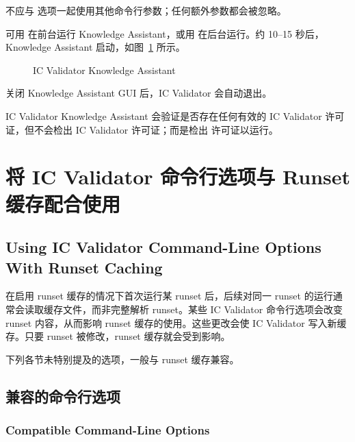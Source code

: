 不应与  选项一起使用其他命令行参数；任何额外参数都会被忽略。

可用  在前台运行 Knowledge Assistant，或用  在后台运行。约 10--15 秒后，Knowledge Assistant 启动，如图~\ref{fig:icv-knowledge-assistant} 所示。

\begin{figure}[htbp]
\centering
{}
\caption{IC Validator Knowledge Assistant}
\label{fig:icv-knowledge-assistant}
\end{figure}

关闭 Knowledge Assistant GUI 后，IC Validator 会自动退出。

IC Validator Knowledge Assistant 会验证是否存在任何有效的 IC Validator 许可证，但不会检出 IC Validator 许可证；而是检出  许可证以运行。

\section{将 IC Validator 命令行选项与 Runset 缓存配合使用}
\subsection*{Using IC Validator Command-Line Options With Runset Caching}

在启用 runset 缓存的情况下首次运行某 runset 后，后续对同一 runset 的运行通常会读取缓存文件，而非完整解析 runset。某些 IC Validator 命令行选项会改变 runset 内容，从而影响 runset 缓存的使用。这些更改会使 IC Validator 写入新缓存。只要 runset 被修改，runset 缓存就会受到影响。

\begin{noteBox}
下列各节未特别提及的选项，一般与 runset 缓存兼容。
\end{noteBox}

\subsection{兼容的命令行选项}
\subsubsection*{Compatible Command-Line Options}

